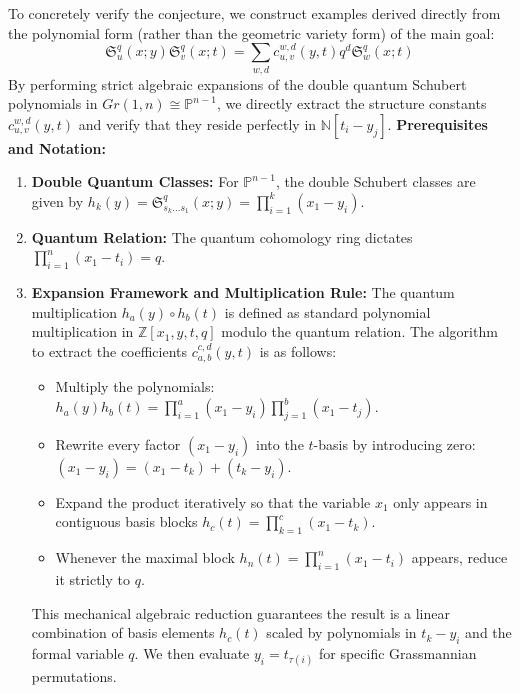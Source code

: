 \documentclass{amsart}
\theoremstyle{definition}
\begin{document}
To concretely verify the conjecture, we construct examples derived directly from the polynomial form (rather than the geometric variety form) of the main goal:
$$ \mathfrak{S}_u^q(x;y) \mathfrak{S}_v^q(x;t) = \sum_{w,d} c_{u,v}^{w,d}(y,t) q^d \mathfrak{S}_w^q(x;t) $$
By performing strict algebraic expansions of the double quantum Schubert polynomials in $Gr(1, n) \cong \mathbb{P}^{n-1}$, we directly extract the structure constants $c_{u,v}^{w,d}(y,t)$ and verify that they reside perfectly in $\mathbb{N}[t_i - y_j]$.
\vspace{2mm}
\noindent\textbf{Prerequisites and Notation:}\\
\begin{enumerate}
    \item \textbf{Double Quantum Classes:} For $\mathbb{P}^{n-1}$, the double Schubert classes are given by $h_k(y) = \mathfrak{S}_{s_k \dots s_1}^q(x; y) = \prod_{i=1}^k (x_1 - y_i)$.
    \item \textbf{Quantum Relation:} The quantum cohomology ring dictates $\prod_{i=1}^n (x_1 - t_i) = q$.
    \item \textbf{Expansion Framework and Multiplication Rule:} The quantum multiplication $h_a(y) \circ h_b(t)$ is defined as standard polynomial multiplication in $\mathbb{Z}[x_1, y, t, q]$ modulo the quantum relation. The algorithm to extract the coefficients $c_{a,b}^{c,d}(y, t)$ is as follows:
    \begin{itemize}
        \item Multiply the polynomials: $h_a(y) h_b(t) = \prod_{i=1}^a (x_1 - y_i) \prod_{j=1}^b (x_1 - t_j)$.
        \item Rewrite every factor $(x_1 - y_i)$ into the $t$-basis by introducing zero: $(x_1 - y_i) = (x_1 - t_k) + (t_k - y_i)$.
        \item Expand the product iteratively so that the variable $x_1$ only appears in contiguous basis blocks $h_c(t) = \prod_{k=1}^c (x_1 - t_k)$.
        \item Whenever the maximal block $h_n(t) = \prod_{i=1}^n (x_1 - t_i)$ appears, reduce it strictly to $q$.
    \end{itemize}
    This mechanical algebraic reduction guarantees the result is a linear combination of basis elements $h_c(t)$ scaled by polynomials in $t_k - y_i$ and the formal variable $q$. We then evaluate $y_i = t_{\tau(i)}$ for specific Grassmannian permutations.
\end{enumerate}
\end{document}
